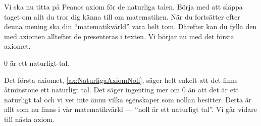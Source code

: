 
Vi ska nu titta på Peanos axiom för de naturliga talen.
Börja med att släppa taget om allt du tror dig känna till om matematiken.
När du fortsätter efter denna mening ska din \enquote{matematikvärld} vara helt 
tom.
Därefter kan du fylla den med axiomen alltefter de presenteras i texten.
Vi börjar nu med det första axiomet.
\begin{axiom}\label{ax:NaturligaAxiomNoll}
  \(0\) är ett naturligt tal. 
\end{axiom}
Det första axiomet, \cref{ax:NaturligaAxiomNoll}, säger helt enkelt att det
finns åtminstone ett naturligt tal.
Det säger ingenting mer om \(0\) än att det är ett naturligt tal och
vi vet inte ännu vilka egenskaper som nollan besitter.
Detta är allt som nu finns i vår matematikvärld --- \enquote{noll är ett 
  naturligt tal}.
Vi går vidare till nästa axiom.

